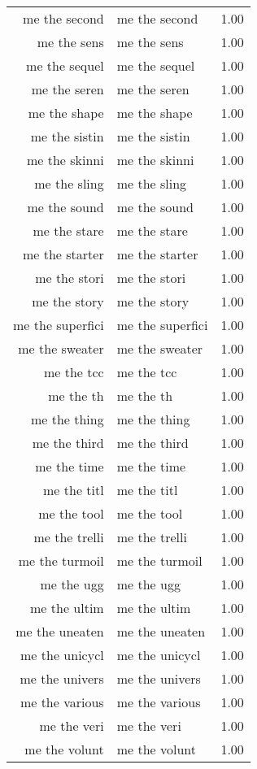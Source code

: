 \begin{table}[ht]
\begin{tabular}{rlr}
  me the second & me the second & 1.00 \\ 
  me the sens & me the sens & 1.00 \\ 
  me the sequel & me the sequel & 1.00 \\ 
  me the seren & me the seren & 1.00 \\ 
  me the shape & me the shape & 1.00 \\ 
  me the sistin & me the sistin & 1.00 \\ 
  me the skinni & me the skinni & 1.00 \\ 
  me the sling & me the sling & 1.00 \\ 
  me the sound & me the sound & 1.00 \\ 
  me the stare & me the stare & 1.00 \\ 
  me the starter & me the starter & 1.00 \\ 
  me the stori & me the stori & 1.00 \\ 
  me the story & me the story & 1.00 \\ 
  me the superfici & me the superfici & 1.00 \\ 
  me the sweater & me the sweater & 1.00 \\ 
  me the tcc & me the tcc & 1.00 \\ 
  me the th & me the th & 1.00 \\ 
  me the thing & me the thing & 1.00 \\ 
  me the third & me the third & 1.00 \\ 
  me the time & me the time & 1.00 \\ 
  me the titl & me the titl & 1.00 \\ 
  me the tool & me the tool & 1.00 \\ 
  me the trelli & me the trelli & 1.00 \\ 
  me the turmoil & me the turmoil & 1.00 \\ 
  me the ugg & me the ugg & 1.00 \\ 
  me the ultim & me the ultim & 1.00 \\ 
  me the uneaten & me the uneaten & 1.00 \\ 
  me the unicycl & me the unicycl & 1.00 \\ 
  me the univers & me the univers & 1.00 \\ 
  me the various & me the various & 1.00 \\ 
  me the veri & me the veri & 1.00 \\ 
  me the volunt & me the volunt & 1.00 \\ 

\end{tabular}
\end{table}
